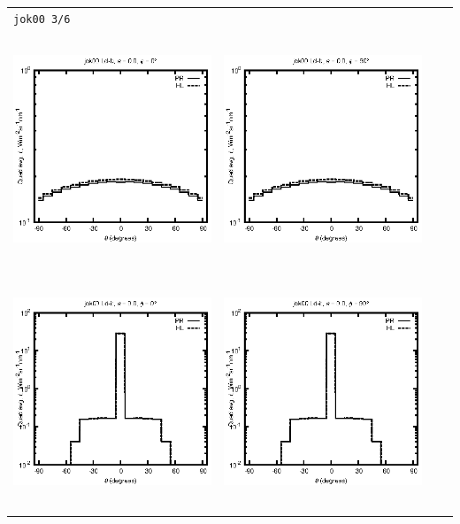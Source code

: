 \documentclass[10pt,a4paper]{article}
\begin{document}
\begin{adjustwidth}{-1.2in}{-1.2in}
\begin{tabular}{c c c c}
\multicolumn{4}{l}{\texttt{jok00 3/6}} \\
\includegraphics[height=7cm]{../eps/jok00_Ld_b_fwd.eps} &
\includegraphics[height=7cm]{../eps/jok00_Ld_b_cross.eps} \\
\includegraphics[height=7cm]{../eps/jok00_Ld_it_fwd.eps} &
\includegraphics[height=7cm]{../eps/jok00_Ld_it_cross.eps} \\

\end{tabular}
\end{adjustwidth}
\end{document}
